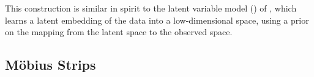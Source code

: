 This construction is similar in spirit to the \gp{} latent variable model (\gplvm{}) of \citet{lawrence2005probabilistic}, which learns a latent embedding of the data into a low-dimensional space, using a \gp{} prior on the mapping from the latent space to the observed space.%





\subsection{M\"{o}bius Strips}


